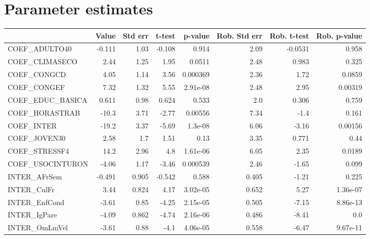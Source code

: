 \section{Parameter estimates}
\begin{tabular}{lrrrrrrr}
\toprule
{} &  Value &  Std err &  t-test &  p-value &  Rob. Std err &  Rob. t-test &  Rob. p-value \\
\midrule
COEF\_ADULTO40      & -0.111 &     1.03 &  -0.108 &    0.914 &          2.09 &      -0.0531 &         0.958 \\
COEF\_CLIMASECO     &   2.44 &     1.25 &    1.95 &   0.0511 &          2.48 &        0.983 &         0.325 \\
COEF\_CONGCD        &   4.05 &     1.14 &    3.56 & 0.000369 &          2.36 &         1.72 &        0.0859 \\
COEF\_CONGEF        &   7.32 &     1.32 &    5.55 & 2.91e-08 &          2.48 &         2.95 &       0.00319 \\
COEF\_EDUC\_BASICA   &  0.611 &     0.98 &   0.624 &    0.533 &           2.0 &        0.306 &         0.759 \\
COEF\_HORASTRAB     &  -10.3 &     3.71 &   -2.77 &  0.00556 &          7.34 &         -1.4 &         0.161 \\
COEF\_INTER         &  -19.2 &     3.37 &   -5.69 &  1.3e-08 &          6.06 &        -3.16 &       0.00156 \\
COEF\_JOVEN30       &   2.58 &      1.7 &    1.51 &     0.13 &          3.35 &        0.771 &          0.44 \\
COEF\_STRESSF4      &   14.2 &     2.96 &     4.8 & 1.61e-06 &          6.05 &         2.35 &        0.0189 \\
COEF\_USOCINTURON   &  -4.06 &     1.17 &   -3.46 & 0.000539 &          2.46 &        -1.65 &         0.099 \\
INTER\_AFrSem       & -0.491 &    0.905 &  -0.542 &    0.588 &         0.405 &        -1.21 &         0.225 \\
INTER\_CulFr        &   3.44 &    0.824 &    4.17 & 3.02e-05 &         0.652 &         5.27 &      1.36e-07 \\
INTER\_EnfCond      &  -3.61 &     0.85 &   -4.25 & 2.15e-05 &         0.505 &        -7.15 &      8.86e-13 \\
INTER\_IgPare       &  -4.09 &    0.862 &   -4.74 & 2.16e-06 &         0.486 &        -8.41 &           0.0 \\
INTER\_OmLmVel      &  -3.61 &     0.88 &    -4.1 & 4.06e-05 &         0.558 &        -6.47 &      9.67e-11 \\

\end{tabular}
